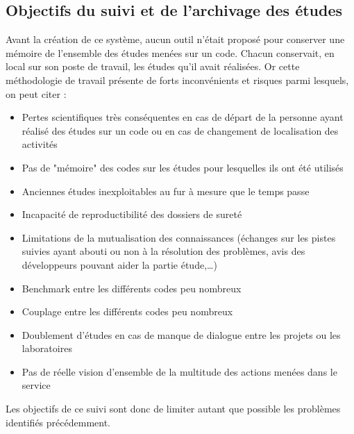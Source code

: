 \subsection{Objectifs du suivi et de l'archivage des études}
Avant la création de ce système, aucun outil n'était proposé pour conserver une mémoire de l'ensemble des études menées sur un code. Chacun conservait, en local sur son poste de travail, les études qu'il avait réalisées. Or cette méthodologie de travail présente de forts inconvénients et risques parmi lesquels, on peut citer : 
\begin{itemize}
   \item Pertes scientifiques très conséquentes en cas de départ de la personne ayant réalisé des études sur un code ou en cas de changement de localisation des activités
   \item Pas de "mémoire" des codes sur les études pour lesquelles ils ont été utilisés
   \item Anciennes études inexploitables au fur à mesure que le temps passe
   \item Incapacité de reproductibilité des dossiers de sureté
   \item Limitations de la mutualisation des connaissances (échanges sur les pistes suivies ayant abouti ou non à la résolution des problèmes, avis des développeurs pouvant aider la partie étude,…)
   \item Benchmark entre les différents codes peu nombreux
   \item Couplage entre les différents codes peu nombreux
   \item Doublement d'études en cas de manque de dialogue entre les projets ou les laboratoires
   \item Pas de réelle vision d'ensemble de la multitude des actions menées dans le service
\end{itemize}
Les objectifs de ce suivi sont donc de limiter autant que possible les problèmes identifiés précédemment.

